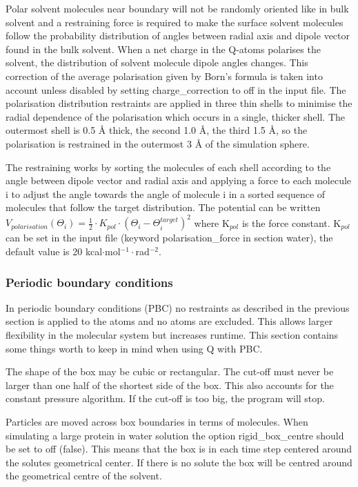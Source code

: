 \documentclass[a4paper,11pt]{article}
\begin{document}
Polar solvent molecules near boundary will not be randomly
oriented like in bulk solvent and a restraining force is required
to make the surface solvent molecules follow the probability
distribution of angles between radial axis and dipole vector found
in the bulk solvent. When a net charge in the Q-atoms polarises
the solvent, the distribution of solvent molecule dipole angles
changes. This correction of the average polarisation given by
Born's formula is taken into account unless disabled by setting
charge\_correction to off in the input file. The polarisation
distribution restraints are applied in three thin shells to
minimise the radial dependence of the polarisation which occurs in
a single, thicker shell. The outermost shell is 0.5 {\AA} thick, the
second 1.0 {\AA}, the third 1.5 {\AA}, so the polarisation is restrained
in the outermost 3 {\AA} of the simulation sphere.

The restraining works by sorting the molecules of each shell
according to the angle between dipole vector and radial axis and
applying a force to each molecule i to adjust the angle towards
the angle of molecule i in a sorted sequence of molecules that
follow the target distribution. The potential can be written
$V_{polarisation} \left(\Theta _i \right) = \frac{1}{2} \cdot
K_{pol} \cdot \left( \Theta _i - \Theta _i^{target} \right)^2$
where K$_{pol}$ is the force constant. K$_{pol}$ can be set in the
input file (keyword polarisation\_force in section water), the
default value is 20 kcal$\cdot$mol$^{-1}\cdot$rad$^{-2}$.

\subsubsection{Periodic boundary conditions}
In periodic boundary conditions (PBC) no restraints as described
in the previous section is applied to the atoms and no atoms are
excluded. This allows larger flexibility in the molecular system
but increases runtime. This section contains some things worth to
keep in mind when using Q with PBC.

The shape of the box may be cubic or rectangular. The cut-off must
never be larger than one half of the shortest side of the box.
This also accounts for the constant pressure algorithm. If the
cut-off is too big, the program will stop.

Particles are moved across box boundaries in terms of molecules.
When simulating a large protein in water solution the option
rigid\_box\_centre should be set to off (false). This means that
the box is in each time step centered around the solutes
geometrical center. If there is no solute the box will be centred
around the geometrical centre of the solvent.
\end{document}
